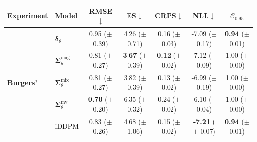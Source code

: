   \begin{tabular}{|l|l|ccccc|}
    \toprule
        Experiment & Model & RMSE$\downarrow$ & ES$\downarrow$ & CRPS$\downarrow$ & NLL$\downarrow$ & $\mathcal{C}_{0.95}$ \\
        \midrule
        \multirow{10}{*}{\textbf{Burgers'}}
        & $\bm\delta_\theta$&   \makecell{0.95 \\ ($\pm$ 0.39)} & \makecell{4.26 \\ ($\pm$ 0.71)} & \makecell{0.16 \\ ($\pm$ 0.03)} & \makecell{-7.09 \\ ($\pm$ 0.17)} & \makecell{\textbf{0.94} \\ ($\pm$ 0.01)} \\
        & $\bm\Sigma_\theta^{\mathrm{diag}}$ &  \makecell{0.81 \\ ($\pm$ 0.27)} & \makecell{\textbf{3.67} \\ ($\pm$ 0.39)} & \makecell{\textbf{0.12} \\ ($\pm$ 0.02)} & \makecell{-7.12 \\ ($\pm$ 0.09)} & \makecell{1.00 \\ ($\pm$ 0.00)} \\
        & $\bm\Sigma_\theta^{\mathrm{mix}}$ &  \makecell{0.81 \\ ($\pm$ 0.27)} & \makecell{3.82 \\ ($\pm$ 0.39)} & \makecell{0.13 \\ ($\pm$ 0.02)} & \makecell{-6.99 \\ ($\pm$ 0.19)} & \makecell{1.00 \\ ($\pm$ 0.00)} \\
        & $\bm\Sigma_\theta^{\mathrm{mv}}$ &  \makecell{\textbf{0.70} \\ ($\pm$ 0.20)} & \makecell{6.35 \\ ($\pm$ 0.32)} & \makecell{0.24 \\ ($\pm$ 0.02)} & \makecell{-6.10 \\ ($\pm$ 0.04)} & \makecell{1.00 \\ ($\pm$ 0.00)} \\
        & iDDPM &  \makecell{0.83 \\ ($\pm$ 0.26)} & \makecell{4.68 \\ ($\pm$ 1.06)} & \makecell{0.15 \\ ($\pm$ 0.02)} & \makecell{\textbf{-7.21 }\\ ($\pm$ 0.07)} & \makecell{\textbf{0.94} \\ ($\pm$ 0.01)} \\

\end{tabular}

